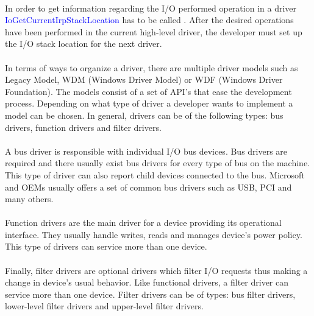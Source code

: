 		\paragraph{}
	   	In order to get information regarding the I/O performed operation in a  driver \textcolor{blue}{IoGetCurrentIrpStackLocation} has to be called . After the desired operations have been performed in the current high-level driver, the developer   must set up the I/O stack location for the next driver. \cite{MSDNIOStackLocations} 
	   
	   	\paragraph{}
	   	In terms of ways to organize a driver, there are multiple driver models such as Legacy Model, WDM (Windows Driver Model) or WDF (Windows Driver Foundation). The models consist of a set of API's that ease the development process. Depending on what type of driver a developer wants to implement a model can be chosen. In general, drivers can be of the following types: bus drivers, function drivers and filter drivers. 
	   	
	   	\paragraph{}
	   	A bus driver is responsible with individual I/O bus devices. Bus drivers are required and there usually exist bus drivers for every type of bus on the machine. This type of driver can also report child devices connected to the bus. Microsoft and OEMs usually offers a set of common bus drivers such as USB, PCI and many others. \cite{MSDNWDMDrivers}
	   	
	   	\paragraph{}
	   	Function drivers are the main driver for a device providing its operational interface. They usually handle writes, reads and manages device's power policy. This type of drivers can service more than one device. \cite{MSDNWDMDrivers}
	   
	   	\paragraph{}
	   	Finally, filter drivers are optional drivers which filter I/O requests thus making a change in device's usual behavior. Like functional drivers, a filter driver can service more than one device. Filter drivers can be of types: bus filter drivers, lower-level filter drivers and upper-level filter drivers. \cite{MSDNWDMDrivers}
	   
